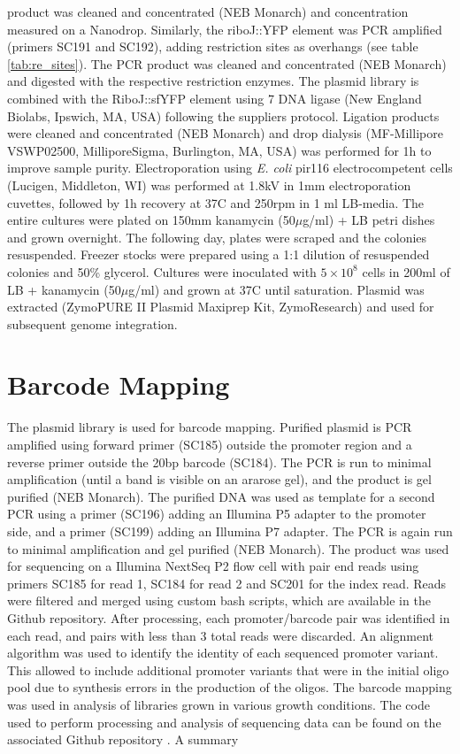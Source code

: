 product was cleaned and concentrated (NEB Monarch) and concentration measured on a Nanodrop. Similarly, the riboJ::YFP element was PCR amplified (primers SC191 and SC192), adding restriction sites as overhangs (see table \ref{tab:re_sites}). The PCR product was cleaned and concentrated (NEB Monarch) and digested with the respective restriction enzymes. The plasmid library is combined with the RiboJ::sfYFP element using 7 DNA ligase (New England Biolabs, Ipswich, MA, USA) following the suppliers protocol. Ligation products were cleaned and concentrated (NEB Monarch) and drop dialysis (MF-Millipore VSWP02500, MilliporeSigma, Burlington, MA, USA)  was performed for 1h to improve sample purity. Electroporation using \textit{E. coli} pir116 electrocompetent cells (Lucigen, Middleton, WI) was performed at 1.8kV in 1mm electroporation cuvettes, followed by 1h recovery at 37C and 250rpm in 1 ml LB-media. The entire cultures were plated on 150mm kanamycin (50$\mu$g/ml) + LB petri dishes and grown overnight. The following day, plates were scraped and the colonies resuspended. Freezer stocks were prepared using a 1:1 dilution of resuspended colonies and 50\% glycerol. Cultures were inoculated with $5\times 10^8$ cells in 200ml of LB + kanamycin (50$\mu$g/ml) and grown at 37C until saturation. Plasmid was extracted (ZymoPURE II Plasmid Maxiprep Kit, ZymoResearch) and used for subsequent genome integration. 


\section{Barcode Mapping}
\label{sec:barcode_mapping}
The plasmid library is used for barcode mapping. Purified plasmid is PCR amplified using forward primer (SC185) outside the promoter region and a reverse primer outside the 20bp barcode (SC184). The PCR is run to minimal amplification (until a band is visible on an ararose gel), and the product is gel purified (NEB Monarch). The purified DNA was used as template for a second PCR using a primer (SC196) adding an Illumina P5 adapter to the promoter side, and a primer (SC199) adding an Illumina P7 adapter. The PCR is again run to minimal amplification and gel purified (NEB Monarch). The product was used for sequencing on a Illumina NextSeq P2 flow cell with pair end reads using primers SC185 for read 1, SC184 for read 2 and SC201 for the index read. Reads were filtered and merged using custom bash scripts, which are available in the Github repository. After processing, each promoter/barcode pair was identified in each read, and pairs with less than 3 total reads were discarded. An alignment algorithm was used to identify the identity of each sequenced promoter variant. This allowed to include additional promoter variants that were in the initial oligo pool due to synthesis errors in the production of the oligos. The barcode mapping was used in analysis of libraries grown in various growth conditions. The code used to perform processing and analysis of sequencing data can be found on the associated Github repository . A summary 

